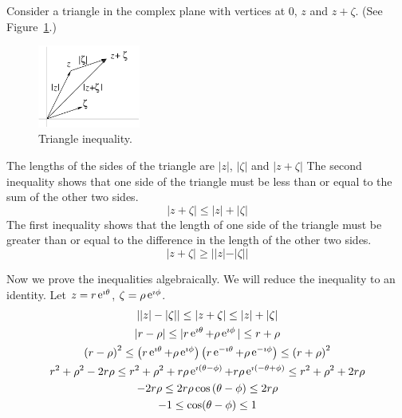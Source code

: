 {%
\begin{Solution}
  \label{solution triangle inequalities}
  Consider a triangle in the complex plane with vertices at $0$, $z$
  and $z + \zeta$.  (See Figure~\ref{triangle}.)
  \begin{figure}[h!]
    \begin{center}
      \includegraphics[width=0.3\textwidth]{fcv/number/triangle}
    \end{center}
    \caption{Triangle inequality.}
    \label{triangle}
  \end{figure}

  The lengths of the sides of the triangle are $|z|$, $|\zeta|$ and 
  $|z + \zeta|$  The second inequality shows that one side of the triangle must 
  be less than or equal to the sum of the other two sides.  
  \[
  |z + \zeta| \leq |z| + |\zeta|
  \]
  The first inequality
  shows that the length of one side of the triangle must be greater than
  or equal to the difference in the length of the other two sides.
  \[
  |z + \zeta| \geq ||z| - |\zeta||
  \]

  Now we prove the inequalities algebraically.  We will reduce the inequality
  to an identity.  Let $z = r \mathop{\mathrm{e}}\nolimits^{\imath \theta}$, $\zeta = \rho \mathop{\mathrm{e}}\nolimits^{\imath \phi}$.
  \begin{gather*}
    ||z| - |\zeta||\leq |z + \zeta| \leq |z| + |\zeta| 
    \\
    |r - \rho| \leq |r \mathop{\mathrm{e}}\nolimits^{\imath \theta} + \rho \mathop{\mathrm{e}}\nolimits^{\imath \phi}| \leq r + \rho 
    \\
    \left( r - \rho \right)^2 \leq \left( r \mathop{\mathrm{e}}\nolimits^{\imath \theta} + \rho \mathop{\mathrm{e}}\nolimits^{\imath \phi} \right)
    \left( r \mathop{\mathrm{e}}\nolimits^{- \imath \theta} + \rho \mathop{\mathrm{e}}\nolimits^{- \imath \phi} \right) 
    \leq \left( r + \rho \right)^2 
    \\
    r^2 + \rho^2 - 2 r \rho \leq r^2 + \rho^2 + r \rho \mathop{\mathrm{e}}\nolimits^{\imath \left( \theta - \phi \right)} +
    r \rho \mathop{\mathrm{e}}\nolimits^{\imath \left( - \theta + \phi \right)} \leq r^2 + \rho^2 + 2 r \rho 
    \\
    - 2 r \rho \leq 2 r \rho \cos\left( \theta - \phi \right) \leq 2 r \rho 
    \\
    -1 \leq \cos(\theta - \phi) \leq 1
  \end{gather*}
\end{Solution}






}
